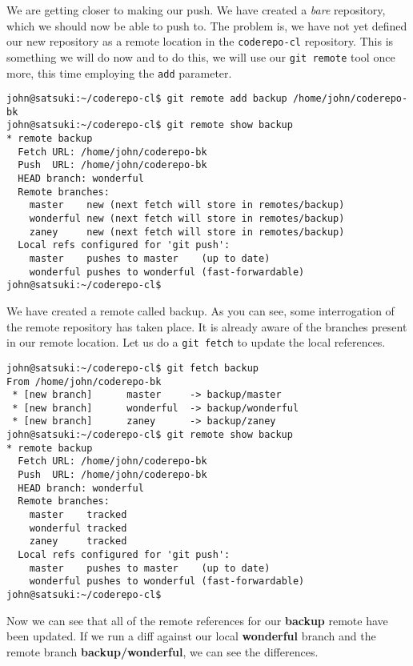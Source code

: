 We are getting closer to making our push.  We have created a \emph{bare} repository, which we should now be able to push to.  The problem is, we have not yet defined our new repository as a remote location in the \texttt{coderepo-cl} repository.  This is something we will do now and to do this, we will use our \texttt{git remote} tool once more, this time employing the \texttt{add} parameter.

\begin{Verbatim}[frame=leftline,framerule=1mm,fontsize=\relsize{-3}] 
john@satsuki:~/coderepo-cl$ git remote add backup /home/john/coderepo-bk
john@satsuki:~/coderepo-cl$ git remote show backup
* remote backup
  Fetch URL: /home/john/coderepo-bk
  Push  URL: /home/john/coderepo-bk
  HEAD branch: wonderful
  Remote branches:
    master    new (next fetch will store in remotes/backup)
    wonderful new (next fetch will store in remotes/backup)
    zaney     new (next fetch will store in remotes/backup)
  Local refs configured for 'git push':
    master    pushes to master    (up to date)
    wonderful pushes to wonderful (fast-forwardable)
john@satsuki:~/coderepo-cl$ 
\end{Verbatim}

We have created a remote called backup.  As you can see, some interrogation of the remote repository has taken place.  It is already aware of the branches present in our remote location.  Let us do a \texttt{git fetch} to update the local references.

\begin{Verbatim}[frame=leftline,framerule=1mm,fontsize=\relsize{-3}] 
john@satsuki:~/coderepo-cl$ git fetch backup
From /home/john/coderepo-bk
 * [new branch]      master     -> backup/master
 * [new branch]      wonderful  -> backup/wonderful
 * [new branch]      zaney      -> backup/zaney
john@satsuki:~/coderepo-cl$ git remote show backup
* remote backup
  Fetch URL: /home/john/coderepo-bk
  Push  URL: /home/john/coderepo-bk
  HEAD branch: wonderful
  Remote branches:
    master    tracked
    wonderful tracked
    zaney     tracked
  Local refs configured for 'git push':
    master    pushes to master    (up to date)
    wonderful pushes to wonderful (fast-forwardable)
john@satsuki:~/coderepo-cl$ 
\end{Verbatim}

Now we can see that all of the remote references for our \textbf{backup} remote have been updated.  If we run a diff against our local \textbf{wonderful} branch and the remote branch \textbf{backup/wonderful}, we can see the differences.

